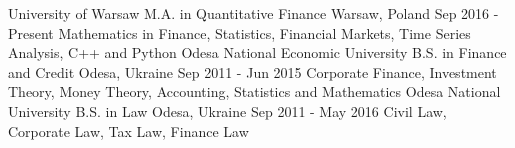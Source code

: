 
\begin{cvsection}[Education]
  \cvexperience
    {University of Warsaw}
    {M.A. in Quantitative Finance}
    {Warsaw, Poland}
    {Sep 2016 - Present}
    {
      Mathematics in Finance, Statistics, Financial Markets, Time Series Analysis, C++ and Python
    }
  \cvexperience
    {Odesa National Economic University}
    {B.S. in Finance and Credit}
    {Odesa, Ukraine}
    {Sep 2011 - Jun 2015}
    {
      Corporate Finance, Investment Theory, Money Theory, Accounting, Statistics and Mathematics
    }
  \cvexperience
    {Odesa National University}
    {B.S. in Law}
    {Odesa, Ukraine}
    {Sep 2011 - May 2016}
    {
      Civil Law, Corporate Law, Tax Law, Finance Law
    }

\end{cvsection}
